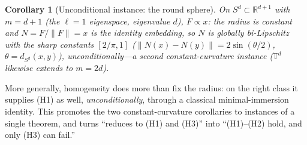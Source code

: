 \documentclass[11pt]{article}
\newtheorem{corollary}[theorem]{Corollary}
\theoremstyle{remark}
\begin{document}
\begin{corollary}[Unconditional instance: the round sphere]\label{cor:sphere}
On $S^d\subset\mathbb{R}^{d+1}$ with $m=d+1$ (the $\ell{=}1$ eigenspace, eigenvalue
$d$), $F\propto x$: the radius is constant and $N=F/\lVert F\rVert=x$ is the
identity embedding, so $N$ is globally bi-Lipschitz with the sharp constants
$[2/\pi,1]$ ($\lVert N(x)-N(y)\rVert=2\sin(\theta/2)$, $\theta=d_{S^d}(x,y)$),
unconditionally---a second constant-curvature instance ($\mathbb{T}^d$ likewise
extends to $m=2d$).
\end{corollary}

\noindent More generally, homogeneity does more than fix the radius: on the right
class it supplies (H1) as well, \emph{unconditionally}, through a classical
minimal-immersion identity. This promotes the two constant-curvature corollaries
to instances of a single theorem, and turns ``reduces to (H1) and (H3)'' into
``(H1)--(H2) hold, and only (H3) can fail.''
\end{document}
